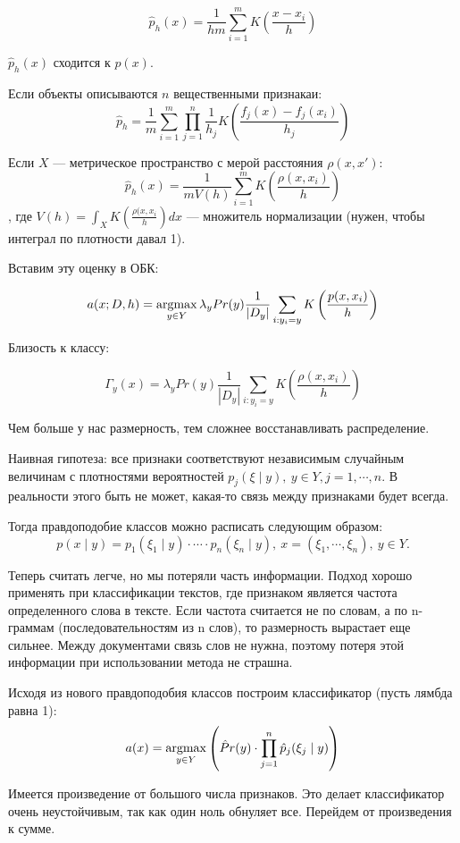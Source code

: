 \[
    \hat p_h(x) = \frac{1}{hm} \sum^m_{i=1} K\left(\frac{x - x_i}{h} \right)
\]

$\hat p_h(x)$ сходится к $p(x)$.

Если объекты описываются $n$ вещественными признакаи:
\[
    \hat p_h = \frac{1}{m} \sum_{i=1}^m \prod_{j=1}^n \frac{1}{h_j} K \left(
    \frac{f_j(x) - f_j(x_i)}{h_j} \right)
\]

Если $X$ --- метрическое пространство с мерой расстояния $\rho(x, x')$:
\[
    \hat p_h(x) = \frac{1}{mV(h)}\sum^m_{i=1} K \left( \frac{\rho(x, x_i)}{h} \right)
\], где $V(h) = \int_X K \left( \frac{\rho(x, x_i}{h} \right) dx$ --- множитель
нормализации (нужен, чтобы интеграл по плотности давал 1).

Вставим эту оценку в ОБК:

\[
    a(x; D, h) = \operatorname*{argmax}_{y \in Y} \lambda_y Pr(y) \frac{1}{|D_y|}
    \sum_{i:y_i=y} K \left( \frac{p(x, x_i)}{h} \right)
\]

Близость к классу:

\[
    \Gamma_y(x) = \lambda_y Pr(y) \frac{1}{|D_y|} \sum_{i:y_i = y} K \left(
    \frac{\rho(x, x_i)}{h} \right)
\]

Чем больше у нас размерность, тем сложнее восстанавливать распределение.

Наивная гипотеза: все признаки соответствуют независимым случайным величинам с
плотностями вероятностей $p_j(\xi \mid y),\ y \in Y, j = 1, \cdots, n$. В
реальности этого быть не может, какая-то связь между признаками будет всегда.

Тогда правдоподобие классов можно расписать следующим образом:
\[
    p(x \mid y) = p_1(\xi_1 \mid y) \cdot \cdots \cdot p_n(\xi_n \mid y),\ x =
    (\xi_1, \cdots, \xi_n),\ y \in Y.
\]

Теперь считать легче, но мы потеряли часть информации. Подход хорошо применять
при классификации текстов, где признаком является частота определенного слова в
тексте. Если частота считается не по словам, а по n-граммам
(последовательностям из n слов), то размерность вырастает еще сильнее. Между
документами связь слов не нужна, поэтому потеря этой информации при
использовании метода не страшна.

Исходя из нового правдоподобия классов построим классификатор (пусть лямбда равна 1):
\[
    a(x) = \operatorname*{argmax}_{y \in Y} \left(\hat Pr(y) \cdot \prod_{j=1}^n \hat p_j(\xi_j
    \mid y) \right)
\]

Имеется произведение от большого числа признаков. Это делает классификатор
очень неустойчивым, так как один ноль обнуляет все. Перейдем от произведения к сумме.

